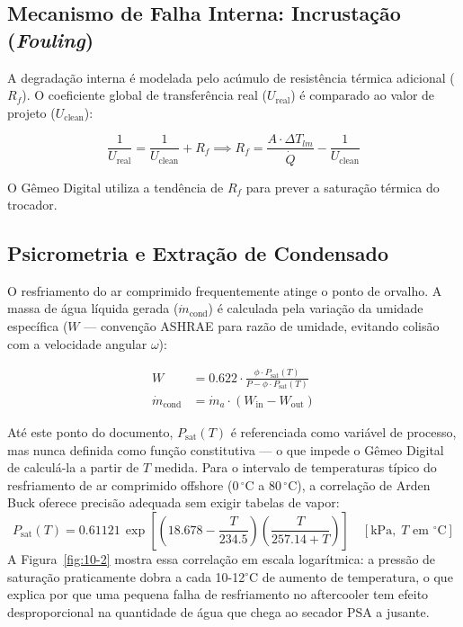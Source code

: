 \documentclass[12pt,a4paper]{article}
\numberwithin{equation}{section}
\numberwithin{table}{section}
\numberwithin{figure}{section}
\begin{document}
	\subsection{\textbf{Mecanismo de Falha Interna: Incrustação (\textit{Fouling})}}
	A degradação interna é modelada pelo acúmulo de resistência térmica adicional ($R_f$). O coeficiente global de transferência real ($U_{\text{real}}$) é comparado ao valor de projeto ($U_{\text{clean}}$):
	
	\begin{equation}\label{eq:s10-5}
	\frac{1}{U_{\text{real}}} = \frac{1}{U_{\text{clean}}} + R_f \implies R_f = \frac{A \cdot \Delta T_{lm}}{\dot{Q}} - \frac{1}{U_{\text{clean}}}
\end{equation}
	
	O Gêmeo Digital utiliza a tendência de $R_f$ para prever a saturação térmica do trocador.
	
	\subsection{\textbf{Psicrometria e Extração de Condensado}}
	O resfriamento do ar comprimido frequentemente atinge o ponto de orvalho. A massa de água líquida gerada ($\dot{m}_{\text{cond}}$) é calculada pela variação da umidade específica ($W$ — convenção ASHRAE para razão de umidade, evitando colisão com a velocidade angular $\omega$):

	\begin{equation}\label{eq:s10-6}
	\begin{aligned}
		W &= 0.622 \cdot \frac{\phi \cdot P_{\text{sat}}(T)}{P - \phi \cdot P_{\text{sat}}(T)} \\[4pt]
		\dot{m}_{\text{cond}} &= \dot{m}_a \cdot (W_{\text{in}} - W_{\text{out}})
	\end{aligned}
\end{equation}

	Até este ponto do documento, $P_{\text{sat}}(T)$ é referenciada como variável de processo, mas nunca definida como função constitutiva — o que impede o Gêmeo Digital de calculá-la a partir de $T$ medida. Para o intervalo de temperaturas típico do resfriamento de ar comprimido offshore ($0\,^{\circ}\text{C}$ a $80\,^{\circ}\text{C}$), a correlação de Arden Buck \cite{buck} oferece precisão adequada sem exigir tabelas de vapor:
	\begin{equation}\label{eq:s10-7}
 P_{\text{sat}}(T) = 0.61121 \, \exp\left[ \left( 18.678 - \frac{T}{234.5} \right) \left( \frac{T}{257.14 + T} \right) \right] \quad [\text{kPa}, \; T \text{ em } ^{\circ}\text{C}]
\end{equation}
	A Figura~\ref{fig:10-2} mostra essa correlação em escala logarítmica: a pressão de saturação praticamente dobra a cada 10-12$^{\circ}$C de aumento de temperatura, o que explica por que uma pequena falha de resfriamento no aftercooler tem efeito desproporcional na quantidade de água que chega ao secador PSA a jusante.
\end{document}
